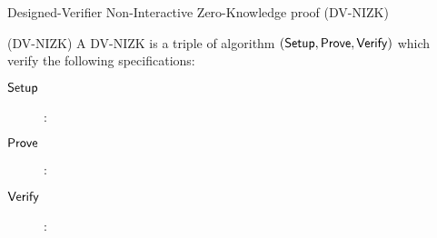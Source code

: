 \begin{subsection}{Designed-Verifier Non-Interactive Zero-Knowledge proof (DV-NIZK)}

  \begin{definition}{(DV-NIZK)} A DV-NIZK is a triple of algorithm $({\mathsf{Setup}}, {\mathsf{Prove}}, {\mathsf{Verify}})$ which verify the following specifications:
    \begin{description}
    \item[${\mathsf{Setup}}$]:

    \item[${\mathsf{Prove}}$]:
    \item[${\mathsf{Verify}}$]:
    \end{description}
  \end{definition}
  
\end{subsection}

